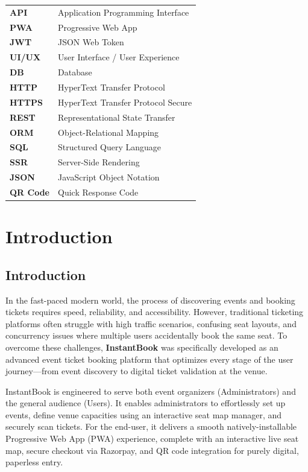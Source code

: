 \documentclass[12pt,a4paper]{report}
\begin{document}
\begin{tabular}{p{3cm}p{10cm}}
\textbf{API} & Application Programming Interface\\
\textbf{PWA} & Progressive Web App\\
\textbf{JWT} & JSON Web Token\\
\textbf{UI/UX} & User Interface / User Experience\\
\textbf{DB} & Database\\
\textbf{HTTP} & HyperText Transfer Protocol\\
\textbf{HTTPS} & HyperText Transfer Protocol Secure\\
\textbf{REST} & Representational State Transfer\\
\textbf{ORM} & Object-Relational Mapping\\
\textbf{SQL} & Structured Query Language\\
\textbf{SSR} & Server-Side Rendering\\
\textbf{JSON} & JavaScript Object Notation\\
\textbf{QR Code} & Quick Response Code\\
\end{tabular}

\clearpage

\pagestyle{main}

\chapter{Introduction}
\section{Introduction}
In the fast-paced modern world, the process of discovering events and booking tickets requires speed, reliability, and accessibility. However, traditional ticketing platforms often struggle with high traffic scenarios, confusing seat layouts, and concurrency issues where multiple users accidentally book the same seat. To overcome these challenges, \textbf{InstantBook} was specifically developed as an advanced event ticket booking platform that optimizes every stage of the user journey—from event discovery to digital ticket validation at the venue.

InstantBook is engineered to serve both event organizers (Administrators) and the general audience (Users). It enables administrators to effortlessly set up events, define venue capacities using an interactive seat map manager, and securely scan tickets. For the end-user, it delivers a smooth natively-installable Progressive Web App (PWA) experience, complete with an interactive live seat map, secure checkout via Razorpay, and QR code integration for purely digital, paperless entry.
\end{document}
